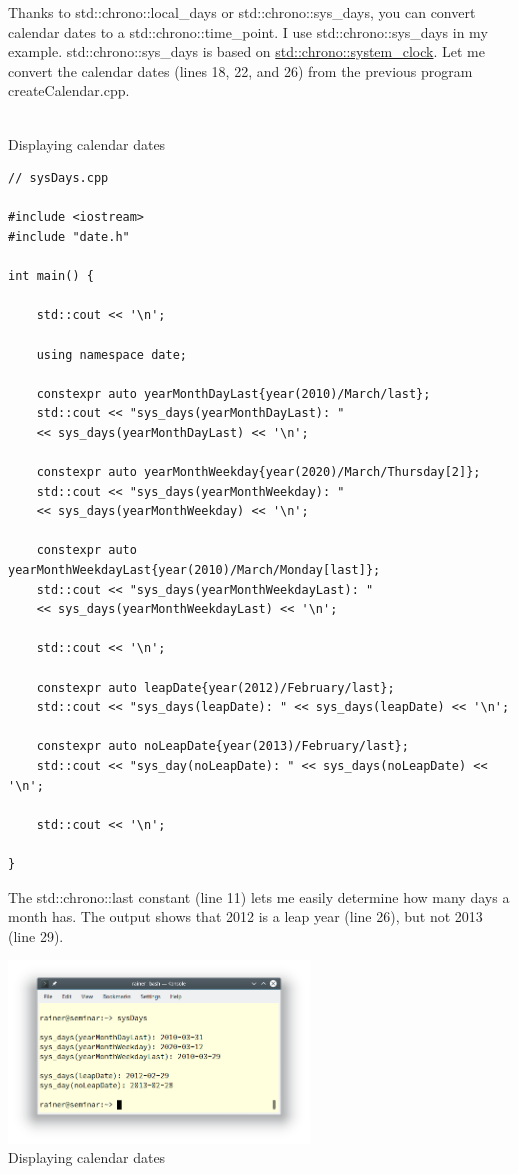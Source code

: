 Thanks to std::chrono::local\_days or std::chrono::sys\_days, you can convert calendar dates to a std::chrono::time\_point. I use std::chrono::sys\_days in my example. std::chrono::sys\_days is based on \href{https://en.cppreference.com/w/cpp/chrono/system_clock}{std::chrono::system\_clock}. Let me convert the calendar dates (lines 18, 22, and 26) from the previous program createCalendar.cpp.

\hspace*{\fill} \\ %
\noindent
Displaying calendar dates
\begin{lstlisting}[style=styleCXX]
 // sysDays.cpp

#include <iostream>
#include "date.h"

int main() {

	std::cout << '\n';
	
	using namespace date;
	
	constexpr auto yearMonthDayLast{year(2010)/March/last};
	std::cout << "sys_days(yearMonthDayLast): "
	<< sys_days(yearMonthDayLast) << '\n';
	
	constexpr auto yearMonthWeekday{year(2020)/March/Thursday[2]};
	std::cout << "sys_days(yearMonthWeekday): "
	<< sys_days(yearMonthWeekday) << '\n';
	
	constexpr auto yearMonthWeekdayLast{year(2010)/March/Monday[last]};
	std::cout << "sys_days(yearMonthWeekdayLast): "
	<< sys_days(yearMonthWeekdayLast) << '\n';
	
	std::cout << '\n';
	
	constexpr auto leapDate{year(2012)/February/last};
	std::cout << "sys_days(leapDate): " << sys_days(leapDate) << '\n';
	
	constexpr auto noLeapDate{year(2013)/February/last};
	std::cout << "sys_day(noLeapDate): " << sys_days(noLeapDate) << '\n';
	
	std::cout << '\n';

}
\end{lstlisting}

The std::chrono::last constant (line 11) lets me easily determine how many days a month has. The output shows that 2012 is a leap year (line 26), but not 2013 (line 29).

\begin{center}
\includegraphics[width=0.6\textwidth]{content/3/chapter5/images/22.png}\\
Displaying calendar dates
\end{center}

